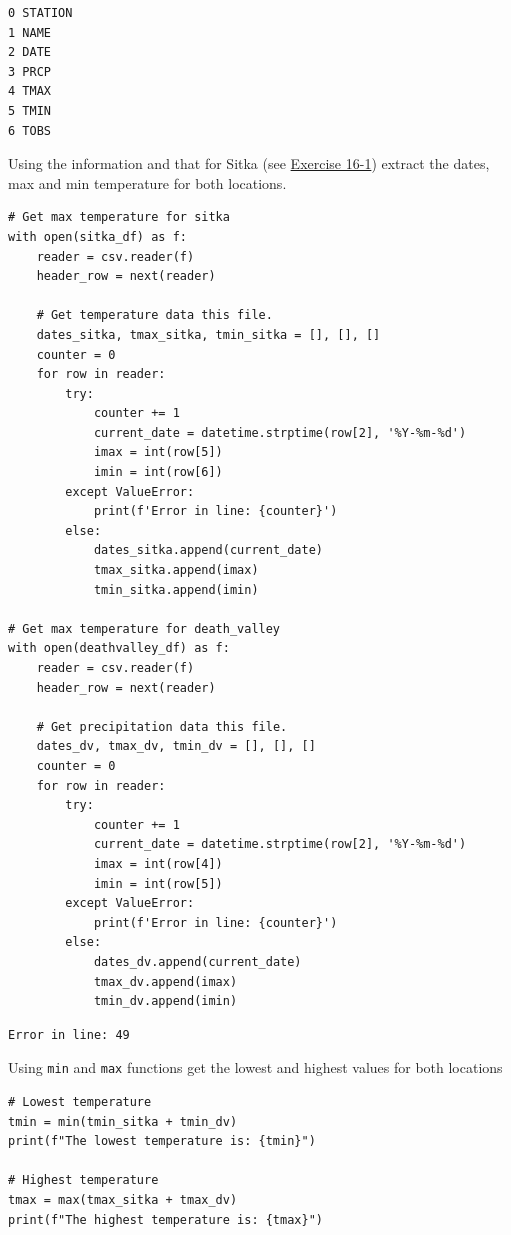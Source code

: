 \documentclass[10pt]{book}
\begin{document}
\begin{enumerate}
\label{org22a79c7}
\begin{verbatim}
0 STATION
1 NAME
2 DATE
3 PRCP
4 TMAX
5 TMIN
6 TOBS
\end{verbatim}

Using the information and that for Sitka (see \hyperref[org2aa0930]{Exercise 16-1}) extract the dates, max and min temperature for both locations.
\begin{verbatim}
# Get max temperature for sitka
with open(sitka_df) as f:
    reader = csv.reader(f)
    header_row = next(reader)

    # Get temperature data this file.
    dates_sitka, tmax_sitka, tmin_sitka = [], [], []
    counter = 0
    for row in reader:
        try:
            counter += 1
            current_date = datetime.strptime(row[2], '%Y-%m-%d')
            imax = int(row[5])
            imin = int(row[6])
        except ValueError:
            print(f'Error in line: {counter}')
        else:
            dates_sitka.append(current_date)
            tmax_sitka.append(imax)
            tmin_sitka.append(imin)

# Get max temperature for death_valley
with open(deathvalley_df) as f:
    reader = csv.reader(f)
    header_row = next(reader)

    # Get precipitation data this file.
    dates_dv, tmax_dv, tmin_dv = [], [], []
    counter = 0
    for row in reader:
        try:
            counter += 1
            current_date = datetime.strptime(row[2], '%Y-%m-%d')
            imax = int(row[4])
            imin = int(row[5])
        except ValueError:
            print(f'Error in line: {counter}')
        else:
            dates_dv.append(current_date)
            tmax_dv.append(imax)
            tmin_dv.append(imin)
\end{verbatim}

\label{org762e212}
\begin{verbatim}
Error in line: 49
\end{verbatim}

Using \texttt{min} and \texttt{max} functions get the lowest and highest values for both locations

\begin{verbatim}
# Lowest temperature
tmin = min(tmin_sitka + tmin_dv)
print(f"The lowest temperature is: {tmin}")

# Highest temperature
tmax = max(tmax_sitka + tmax_dv)
print(f"The highest temperature is: {tmax}")
\end{verbatim}


\end{enumerate}
\end{document}
